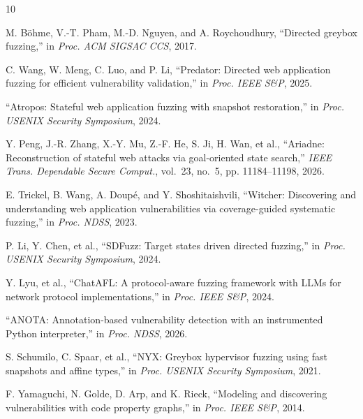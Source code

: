 \documentclass[letterpaper,twocolumn,10pt]{article}
\begin{document}

\begin{thebibliography}{10}

M. B\"ohme, V.-T. Pham, M.-D. Nguyen, and A. Roychoudhury,
``Directed greybox fuzzing,''
in \emph{Proc. ACM SIGSAC CCS}, 2017.

C. Wang, W. Meng, C. Luo, and P. Li,
``Predator: Directed web application fuzzing for efficient vulnerability validation,''
in \emph{Proc. IEEE S\&P}, 2025.

``Atropos: Stateful web application fuzzing with snapshot restoration,''
in \emph{Proc. USENIX Security Symposium}, 2024.

Y. Peng, J.-R. Zhang, X.-Y. Mu, Z.-F. He, S. Ji, H. Wan, et al.,
``Ariadne: Reconstruction of stateful web attacks via goal-oriented state search,''
\emph{IEEE Trans. Dependable Secure Comput.}, vol.~23, no.~5, pp. 11184--11198, 2026.

E. Trickel, B. Wang, A. Doup\'e, and Y. Shoshitaishvili,
``Witcher: Discovering and understanding web application vulnerabilities via coverage-guided systematic fuzzing,''
in \emph{Proc. NDSS}, 2023.

P. Li, Y. Chen, et al.,
``SDFuzz: Target states driven directed fuzzing,''
in \emph{Proc. USENIX Security Symposium}, 2024.

Y. Lyu, et al.,
``ChatAFL: A protocol-aware fuzzing framework with LLMs for network protocol implementations,''
in \emph{Proc. IEEE S\&P}, 2024.

``ANOTA: Annotation-based vulnerability detection with an instrumented Python interpreter,''
in \emph{Proc. NDSS}, 2026.

S. Schumilo, C. Spaar, et al.,
``NYX: Greybox hypervisor fuzzing using fast snapshots and affine types,''
in \emph{Proc. USENIX Security Symposium}, 2021.

F. Yamaguchi, N. Golde, D. Arp, and K. Rieck,
``Modeling and discovering vulnerabilities with code property graphs,''
in \emph{Proc. IEEE S\&P}, 2014.

\end{thebibliography}
\end{document}
